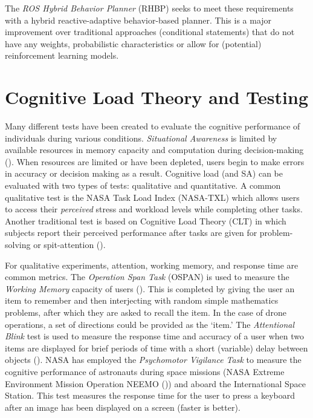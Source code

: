 The \textit{ROS Hybrid Behavior Planner} (RHBP) seeks to meet these requirements with a hybrid reactive-adaptive behavior-based planner. This is a major improvement over traditional approaches (conditional statements) that do not have any weights, probabilistic characteristics or allow for (potential) reinforcement learning models. 

\section{Cognitive Load Theory and Testing}
Many different tests have been created to evaluate the cognitive performance of individuals during various conditions. \textit{Situational Awareness} is limited by available resources in memory capacity and computation during decision-making (\cite{Endsley}). When resources are limited or have been depleted, users begin to make errors in accuracy or decision making as a result. Cognitive load (and SA) can be evaluated with two types of tests: qualitative and quantitative. A common qualitative test is the NASA Task Load Index (NASA-TXL) which allows users to access their \textit{perceived} stress and workload levels while completing other tasks. Another traditional test is based on Cognitive Load Theory (CLT) in which subjects report their perceived performance after tasks are given for problem-solving or spit-attention (\cite{Chandler}).


For qualitative experiments, attention, working memory, and response time are common metrics. The \textit{Operation Span Task} (OSPAN) is used to measure the \textit{Working Memory} capacity of users (\cite{ospan2}). This is completed by giving the user an item to remember and then interjecting with random simple mathematics problems, after which they are asked to recall the item. In the case of drone operations, a set of directions could be provided as the `item.' The \textit{Attentional Blink} test is used to measure the response time and accuracy of a user when two items are displayed for brief periods of time with a short (variable) delay between objects (\cite{Nieuwenstein}). NASA has employed the \textit{Psychomotor Vigilance Task} to measure the cognitive performance of astronauts during space missions (NASA Extreme Environment Mission Operation NEEMO (\cite{nasa2})) and aboard the International Space Station. This test measures the response time for the user to press a keyboard after an image has been displayed on a screen (faster is better). 

